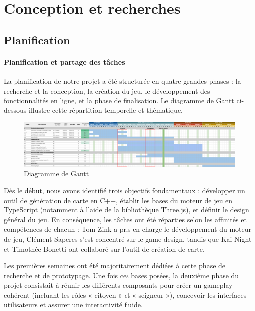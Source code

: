 
\section{Conception et recherches}
\subsection{Planification}

\paragraph{Planification et partage des tâches}

La planification de notre projet a été structurée en quatre grandes phases : la recherche et la conception, la création du jeu, le développement des fonctionnalités en ligne, et la phase de finalisation. Le diagramme de Gantt ci-dessous illustre cette répartition temporelle et thématique. 

\begin{figure}[!h]
    \centering
    \includegraphics[width=0.99\linewidth]{images/gantt.png}
    \caption{Diagramme de Gantt}
    \label{fig:enter-label}
\end{figure}


Dès le début, nous avons identifié trois objectifs fondamentaux : développer un outil de génération de carte en C++, établir les bases du moteur de jeu en TypeScript (notamment à l’aide de la bibliothèque Three.js), et définir le design général du jeu. En conséquence, les tâches ont été réparties selon les affinités et compétences de chacun : Tom Zink a pris en charge le développement du moteur de jeu, Clément Saperes s’est concentré sur le game design, tandis que Kai Night et Timothée Bonetti ont collaboré sur l’outil de création de carte.

Les premières semaines ont été majoritairement dédiées à cette phase de recherche et de prototypage. Une fois ces bases posées, la deuxième phase du projet consistait à réunir les différents composants pour créer un gameplay cohérent (incluant les rôles « citoyen » et « seigneur »), concevoir les interfaces utilisateurs et assurer une interactivité fluide.


